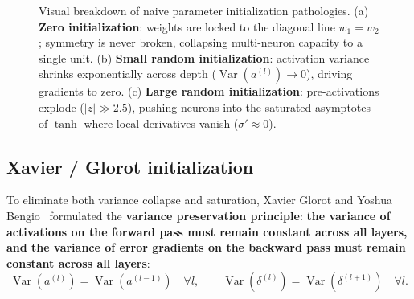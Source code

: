 \begin{figure}[H]
\caption{Visual breakdown of naive parameter initialization pathologies. (a) \textbf{Zero initialization}: weights are locked to the diagonal line $w_1 = w_2$; symmetry is never broken, collapsing multi-neuron capacity to a single unit. (b) \textbf{Small random initialization}: activation variance shrinks exponentially across depth ($\operatorname{Var}(a^{(l)}) \to 0$), driving gradients to zero. (c) \textbf{Large random initialization}: pre-activations explode ($|z| \gg 2.5$), pushing neurons into the saturated asymptotes of $\tanh$ where local derivatives vanish ($\sigma' \approx 0$).}
\label{fig:initialization_pathologies_visual}
\end{figure}

\subsection{Xavier / Glorot initialization}
\label{sec:xavier_glorot_derivation}

To eliminate both variance collapse and saturation, Xavier Glorot and Yoshua Bengio~\cite{glorot2010understanding} formulated the \textbf{variance preservation principle}: \textbf{the variance of activations on the forward pass must remain constant across all layers, and the variance of error gradients on the backward pass must remain constant across all layers}:
\begin{equation}
\operatorname{Var}(a^{(l)}) = \operatorname{Var}(a^{(l-1)}) \quad \forall l, \qquad \operatorname{Var}(\delta^{(l)}) = \operatorname{Var}(\delta^{(l+1)}) \quad \forall l.
\label{eq:variance_preservation_criterion}
\end{equation}

